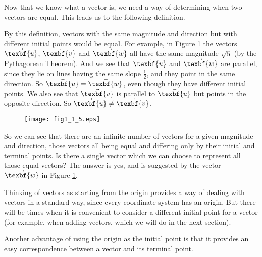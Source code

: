 Now that we know what a vector is, we need a way of determining when two vectors are equal.  This leads us to the
following definition.

By this definition, vectors with the same magnitude and direction but with different initial points would be
equal. For example, in Figure \ref{fig:veceq} the vectors $\vec{\texbf{u}}$, $\vec{\texbf{v}}$ and $\vec{\texbf{w}}$ all have the same
magnitude $\sqrt 5$ (by the Pythagorean Theorem).  And we see that $\vec{\texbf{u}}$ and $\vec{\texbf{w}}$ are parallel, since they
lie on lines having the same slope $\frac{1}{2}$, and they point in the same direction. So $\vec{\texbf{u}} = \vec{\texbf{w}}$,
even though they have different initial points.  We also see that $\vec{\texbf{v}}$ is parallel to $\vec{\texbf{u}}$ but points in the
opposite direction. So $\vec{\texbf{u}} \ne \vec{\texbf{v}}$.

\begin{figure}[h]
 \begin{center}
  \texttt{[image: fig1\_1\_5.eps]}
 \end{center}
 \caption[]{}
 \label{fig:veceq}
\end{figure}

So we can see that there are an infinite number of vectors for a given magnitude and direction, those vectors all
being equal and differing only by their initial and terminal points.  Is there a single vector which we can choose to
represent all those equal vectors?  The answer is yes, and is suggested by the vector $\vec{\texbf{w}}$ in Figure
\ref{fig:veceq}.
\newpage
{}

\vspace{3mm}
Thinking of vectors as starting from the origin provides a way of dealing with vectors in a standard way, since every
coordinate system has an origin.  But there
will be times when it is convenient to consider a different initial point for a vector (for example, when adding
vectors, which we will do in the next section).

Another advantage of using the origin as the initial point is that it provides an easy correspondence between a
vector and its terminal point.

